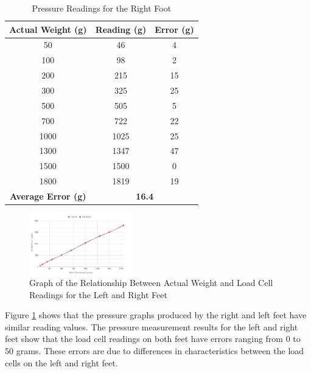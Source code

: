 \begin{enumerate}[label=\Alph*.]
        \begin{table}[h!]
            \centering
            \caption{Pressure Readings for the Right Foot}
            \begin{tabular}{|c|c|c|}
                \hline
                \textbf{Actual Weight (g)} & \textbf{Reading (g)} & \textbf{Error (g)} \\
                \hline
                50    & 46    & 4    \\
                100   & 98    & 2    \\
                200   & 215   & 15   \\
                300   & 325   & 25   \\
                500   & 505   & 5    \\
                700   & 722   & 22   \\
                1000  & 1025  & 25   \\
                1300  & 1347  & 47   \\
                1500  & 1500  & 0    \\
                1800  & 1819  & 19   \\
                \hline
                \textbf{Average Error (g)} & \multicolumn{2}{c|}{\textbf{16.4}} \\
                \hline
            \end{tabular}
            \label{tab:measurement_weight_right_foot}
        \end{table}

        \begin{figure}[h]
            \centering
            \includegraphics[width=0.4\textwidth]{gambar/chart_tekanan_kaki.png}
            \caption{Graph of the Relationship Between Actual Weight and Load Cell Readings for the Left and Right Feet}
            \label{fig:foot_pressure}
        \end{figure}

        \hspace*{1em} Figure \ref{fig:foot_pressure} shows that the pressure graphs produced by the right and left feet have similar reading values. The pressure measurement results for the left and right feet show that the load cell readings on both feet have errors ranging from 0 to 50 grams. These errors are due to differences in characteristics between the load cells on the left and right feet. 


\end{enumerate}
